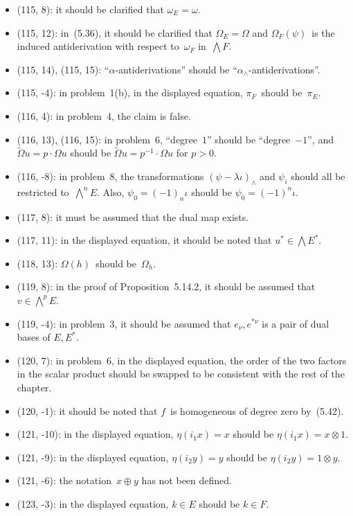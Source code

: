 \documentclass[letterpaper,12pt]{article}
\newcommand{\dsum}{\oplus}
\newcommand{\mult}{\cdot}
\newcommand{\tprod}{\otimes}
\newcommand{\eprod}{\wedge}
\newcommand{\bigeprod}{\bigwedge}
\begin{document}
\begin{itemize}
\item (115, 8): it should be clarified that \(\omega_E=\omega\).
\item (115, 12): in~(5.36), it should be clarified that \(\Omega_E=\Omega\) and \(\Omega_F(\psi)\)~is the induced antiderivation with respect to~\(\omega_F\) in~\(\bigeprod F\).
\item (115, 14), (115, 15): ``\(\alpha\)-antiderivations'' should be ``\(\alpha_{\eprod}\)-antiderivations''.
\item (115, -4): in problem~1(b), in the displayed equation, \(\pi_F\)~should be~\(\pi_E\).
\item (116, 4): in problem~4, the claim is false.
\item (116, 13), (116, 15): in problem~6, ``degree~\(1\)'' should be ``degree~\(-1\)'', and \(\widetilde{\Omega}u=p\mult\Omega u\) should be \(\widetilde{\Omega}u=p^{-1}\mult\Omega u\) for \(p>0\).
\item (116, -8): in problem~8, the transformations \((\psi-\lambda\iota)_{\eprod}\) and \(\psi_i\) should all be restricted to~\(\bigeprod^n E\). Also, \(\psi_0=(-1)_n\iota\) should be \(\psi_0=(-1)^n\iota\).
\item (117, 8): it must be assumed that the dual map exists.
\item (117, 11): in the displayed equation, it should be noted that \(u^*\in\bigeprod E^*\).
\item (118, 13): \(\Omega(h)\)~should be~\(\Omega_h\).
\item (119, 8): in the proof of Proposition~5.14.2, it should be assumed that \(v\in\bigeprod^p E\).
\item (119, -4): in problem~3, it should be assumed that \(e_{\nu},e^{*\nu}\) is a pair of dual bases of \(E,E^*\).
\item (120, 7): in problem~6, in the displayed equation, the order of the two factors in the scalar product should be swapped to be consistent with the rest of the chapter.
\item (120, -1): it should be noted that \(f\)~is homogeneous of degree zero by~(5.42).
\item (121, -10): in the displayed equation, \(\eta(i_1x)=x\) should be \(\eta(i_1x)=x\tprod 1\).
\item (121, -9): in the displayed equation, \(\eta(i_2y)=y\) should be \(\eta(i_2y)=1\tprod y\).
\item (121, -6): the notation~\(x\dsum y\) has not been defined.
\item (123, -3): in the displayed equation, \(k\in E\) should be \(k\in F\).

\end{itemize}
\end{document}
